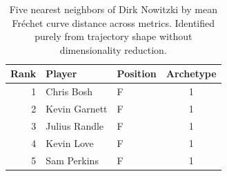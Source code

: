 \begin{table}[htbp]
  \centering\small
  \begin{tabular}{rllc}
    \toprule
    Rank & Player & Position & Archetype \\
    \midrule
    1 & Chris Bosh & F & 1 \\
    2 & Kevin Garnett & F & 1 \\
    3 & Julius Randle & F & 1 \\
    4 & Kevin Love & F & 1 \\
    5 & Sam Perkins & F & 1 \\
    \bottomrule
  \end{tabular}
  \caption{Five nearest neighbors of Dirk Nowitzki by mean Fr\'{e}chet curve distance across metrics. Identified purely from trajectory shape without dimensionality reduction.}
  \label{tab:Dirk_Nowitzki_frechet_curve_neighbors}
\end{table}

